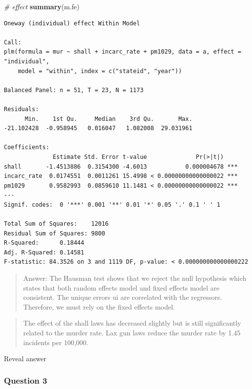 \documentclass[]{article}
\newenvironment{Shaded}{\begin{snugshade}}{\end{snugshade}}
\newcommand{\KeywordTok}[1]{\textcolor[rgb]{0.13,0.29,0.53}{\textbf{#1}}}
\newcommand{\CommentTok}[1]{\textcolor[rgb]{0.56,0.35,0.01}{\textit{#1}}}
\newcommand{\NormalTok}[1]{#1}
\theoremstyle{definition}
\theoremstyle{definition}
\theoremstyle{definition}
\theoremstyle{remark}
\begin{document}
\begin{Shaded}
\begin{Highlighting}[]
\CommentTok{# effect}
\KeywordTok{summary}\NormalTok{(m.fe)}
\end{Highlighting}
\end{Shaded}

\begin{verbatim}
Oneway (individual) effect Within Model

Call:
plm(formula = mur ~ shall + incarc_rate + pm1029, data = a, effect = "individual", 
    model = "within", index = c("stateid", "year"))

Balanced Panel: n = 51, T = 23, N = 1173

Residuals:
      Min.    1st Qu.     Median    3rd Qu.       Max. 
-21.102428  -0.958945   0.016047   1.082008  29.031961 

Coefficients:
              Estimate Std. Error t-value              Pr(>|t|)    
shall       -1.4513886  0.3154300 -4.6013           0.000004678 ***
incarc_rate  0.0174551  0.0011261 15.4998 < 0.00000000000000022 ***
pm1029       0.9582993  0.0859610 11.1481 < 0.00000000000000022 ***
---
Signif. codes:  0 '***' 0.001 '**' 0.01 '*' 0.05 '.' 0.1 ' ' 1

Total Sum of Squares:    12016
Residual Sum of Squares: 9800
R-Squared:      0.18444
Adj. R-Squared: 0.14581
F-statistic: 84.3526 on 3 and 1119 DF, p-value: < 0.000000000000000222
\end{verbatim}

\begin{quote}
Answer: The Hausman test shows that we reject the null hypothesis which
states that both random effects model and fixed effects model are
consistent. The unique errors ui are correlated with the regressors.
Therefore, we must rely on the fixed effects model.
\end{quote}

\begin{quote}
The effect of the shall laws has decreased slightly but is still
significantly related to the murder rate. Lax gun laws reduce the murder
rate by 1.45 incidents per 100,000.
\end{quote}

 Reveal answer

\subsubsection{Question 3}\label{question-3-1}
\end{document}
